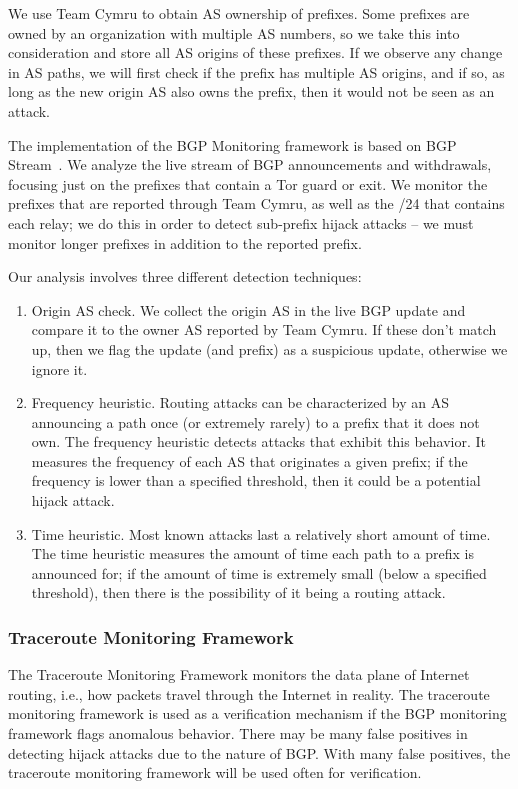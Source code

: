 We use Team Cymru \cite{teamcymru} to obtain AS ownership of prefixes. Some prefixes are owned by an organization with multiple AS numbers, so we take this into consideration and store all AS origins of these prefixes. If we observe any change in AS paths, we will first check if the prefix has multiple AS origins, and if so, as long as the new origin AS also owns the prefix, then it would not be seen as an attack. 

The implementation of the BGP Monitoring framework is based on BGP Stream~\cite{bgpstream}.  We analyze the live stream of BGP announcements and withdrawals, focusing just on the prefixes that contain a Tor guard or exit.  We monitor the prefixes that are reported through Team Cymru, as well as the /24 that contains each relay; we do this in order to detect sub-prefix hijack attacks -- we must monitor longer prefixes in addition to the reported prefix.  

Our analysis involves three different detection techniques:

\begin{enumerate}
\item Origin AS check.  We collect the origin AS in the live BGP update and compare it to the owner AS reported by Team Cymru.  If these don't match up, then we flag the update (and prefix) as a suspicious update, otherwise we ignore it. 
\item Frequency heuristic.  Routing attacks can be 
characterized by an AS announcing a path once (or extremely rarely) to a prefix 
that it does not own.  The frequency heuristic detects attacks that exhibit this behavior. 
It measures the frequency of each AS that originates a given prefix; if the frequency is 
lower than a specified threshold, then it could be a potential hijack attack.
\item Time heuristic.  Most known attacks 
last a relatively short amount of time. The time heuristic measures the amount of time each 
path to a prefix is announced for; if the amount of time is extremely small (below a specified threshold), 
then there is the possibility of it being a routing attack. 
\end{enumerate}  

\subsubsection{Traceroute Monitoring Framework} 
The Traceroute Monitoring Framework monitors the data plane of Internet routing, i.e., how packets travel through the Internet in reality. The traceroute monitoring framework is used as a verification mechanism if the BGP monitoring framework flags anomalous behavior. There may be many false positives in detecting hijack attacks due to the nature of BGP.  With many false positives, the traceroute monitoring framework will be used often for verification.

